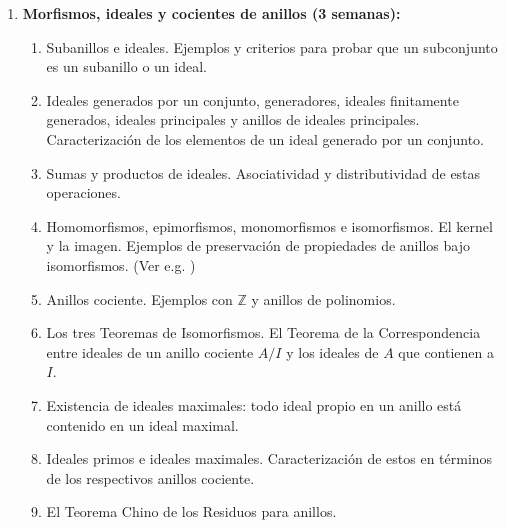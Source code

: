 \begin{refsection}
\begin{enumerate}
\item \textbf{Morfismos, ideales y cocientes de anillos (3 semanas):} 
\begin{enumerate}
    \item Subanillos e ideales. Ejemplos y criterios para probar que un subconjunto es un subanillo o un ideal.

    \item Ideales generados por un conjunto, generadores, ideales finitamente generados, ideales principales y anillos de ideales principales. Caracterización de los elementos de un ideal generado por un conjunto.
    \item Sumas y productos de ideales. Asociatividad y distributividad de estas operaciones.
    \item Homomorfismos, epimorfismos, monomorfismos e isomorfismos. El kernel y la imagen. Ejemplos de preservación de propiedades de anillos bajo isomorfismos. (Ver e.g. \cite[p. 72]{Alu21})
    \item Anillos cociente. Ejemplos con $\mathbb{Z}$ y anillos de polinomios.
    \item Los tres Teoremas de Isomorfismos. El Teorema de la Correspondencia entre ideales de un anillo cociente $A/I$ y los ideales de $A$ que contienen a $I$.
    \item Existencia de ideales maximales: todo ideal propio en un anillo está contenido en un ideal maximal.
    \item Ideales primos e ideales maximales. Caracterización de estos en términos de los respectivos anillos cociente.
    \item El Teorema Chino de los Residuos para anillos.
\end{enumerate}


\end{enumerate}
\end{refsection}
